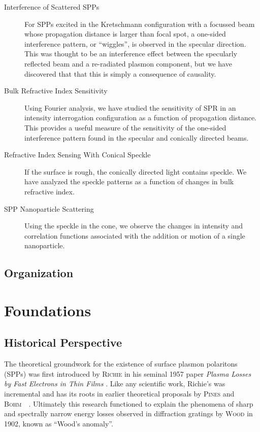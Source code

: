 \documentclass[a4paper,titlepage,onecolumn]{report}
\begin{document}
\begin{description}
\item[{Interference of Scattered SPPs}]
For SPPs excited in the Kretschmann configuration with a focussed beam
whose propagation distance is larger than focal spot, a one-sided
interference pattern, or ``wiggles'', is observed in the specular direction.  This was
thought to be an interference effect between the specularly reflected beam
and a re-radiated plasmon component, but we have discovered that that this is
simply a consequence of causality.
\item[{Bulk Refractive Index Sensitivity}] 
Using Fourier analysis, we have studied the sensitivity of SPR in an intensity
interrogation configuration as a function of propagation distance.  This
provides a useful measure of the sensitivity of the one-sided interference
pattern found in the specular and conically directed beams.
\item[{Refractive Index Sensing With Conical Speckle}]
If the surface is rough, the conically directed light contains speckle.  We
have analyzed the speckle patterns as a function of changes in bulk
refractive index.
\item[{SPP Nanoparticle Scattering}]
Using the speckle in the cone, we observe the changes in intensity and
correlation functions associated with the addition or motion of a single
nanoparticle.
\end{description}

\section{Organization}

\chapter{Foundations}
\section{Historical Perspective}
The theoretical groundwork for the existence of surface plasmon polaritons
(SPPs) was first introduced by \textsc{Richie} in his seminal 1957 paper
\textit{Plasma Losses by Fast Electrons in Thin Films}
\cite{ritchie1957plasma}.  Like any scientific work, Richie's was
incremental and has its roots in earlier theoretical proposals by
\textsc{Pines} and
\textsc{Bohm}~\cite{bohm1951collective}~\cite{pines1952collective}.
Ultimately this research functioned to explain the phenomena of sharp and
spectrally narrow energy losses observed in diffraction gratings by
\textsc{Wood} in 1902, known as ``Wood's anomaly''.
\end{document}
